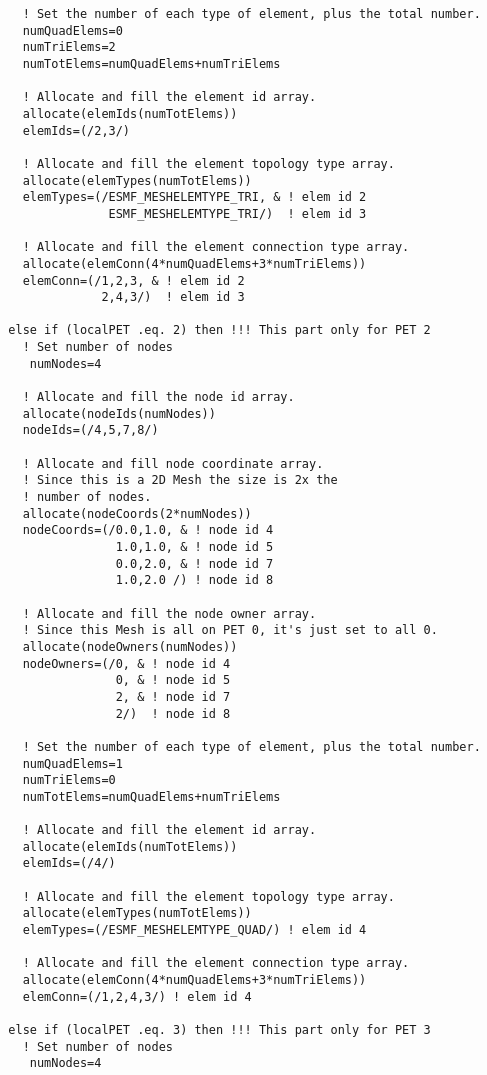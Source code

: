 \begin{verbatim}
    ! Set the number of each type of element, plus the total number.
    numQuadElems=0
    numTriElems=2
    numTotElems=numQuadElems+numTriElems

    ! Allocate and fill the element id array.
    allocate(elemIds(numTotElems))
    elemIds=(/2,3/) 

    ! Allocate and fill the element topology type array.
    allocate(elemTypes(numTotElems))
    elemTypes=(/ESMF_MESHELEMTYPE_TRI, & ! elem id 2
                ESMF_MESHELEMTYPE_TRI/)  ! elem id 3

    ! Allocate and fill the element connection type array.
    allocate(elemConn(4*numQuadElems+3*numTriElems))
    elemConn=(/1,2,3, & ! elem id 2
               2,4,3/)  ! elem id 3

  else if (localPET .eq. 2) then !!! This part only for PET 2
    ! Set number of nodes
     numNodes=4

    ! Allocate and fill the node id array.
    allocate(nodeIds(numNodes))
    nodeIds=(/4,5,7,8/) 

    ! Allocate and fill node coordinate array.
    ! Since this is a 2D Mesh the size is 2x the
    ! number of nodes.
    allocate(nodeCoords(2*numNodes))
    nodeCoords=(/0.0,1.0, & ! node id 4
                 1.0,1.0, & ! node id 5
                 0.0,2.0, & ! node id 7
                 1.0,2.0 /) ! node id 8

    ! Allocate and fill the node owner array.
    ! Since this Mesh is all on PET 0, it's just set to all 0.
    allocate(nodeOwners(numNodes))
    nodeOwners=(/0, & ! node id 4
                 0, & ! node id 5
                 2, & ! node id 7
                 2/)  ! node id 8

    ! Set the number of each type of element, plus the total number.
    numQuadElems=1
    numTriElems=0
    numTotElems=numQuadElems+numTriElems

    ! Allocate and fill the element id array.
    allocate(elemIds(numTotElems))
    elemIds=(/4/) 

    ! Allocate and fill the element topology type array.
    allocate(elemTypes(numTotElems))
    elemTypes=(/ESMF_MESHELEMTYPE_QUAD/) ! elem id 4

    ! Allocate and fill the element connection type array.
    allocate(elemConn(4*numQuadElems+3*numTriElems))
    elemConn=(/1,2,4,3/) ! elem id 4

  else if (localPET .eq. 3) then !!! This part only for PET 3
    ! Set number of nodes
     numNodes=4


\end{verbatim}
